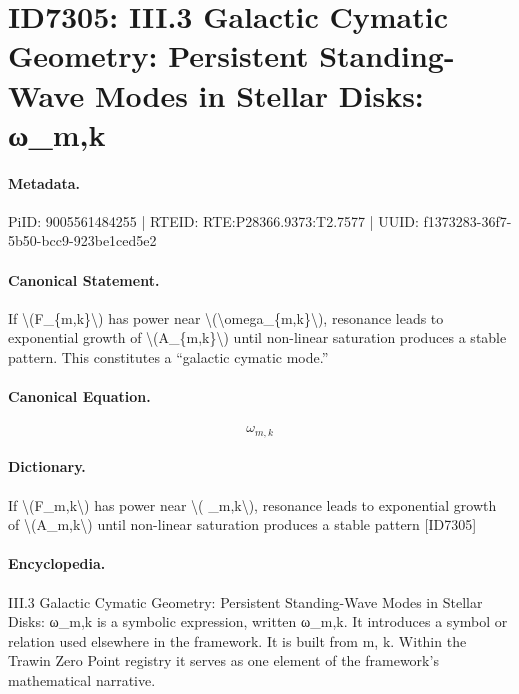 \section*{ID7305: III.3 Galactic Cymatic Geometry: Persistent Standing-Wave Modes in Stellar Disks: ω\_m,k}
\paragraph{Metadata.}
PiID: 9005561484255 | RTEID: RTE:P28366.9373:T2.7577 | UUID: f1373283-36f7-5b50-bcc9-923be1ced5e2

\paragraph{Canonical Statement.}
If \textbackslash{}(F\_\{m,k\}\textbackslash{}) has power near \textbackslash{}(\textbackslash{}omega\_\{m,k\}\textbackslash{}), resonance leads to exponential growth of \textbackslash{}(A\_\{m,k\}\textbackslash{}) until non-linear saturation produces a stable pattern. This constitutes a “galactic cymatic mode.”

\paragraph{Canonical Equation.}
\[
\omega_{m,k}
\]

\paragraph{Dictionary.}
If \textbackslash{}(F\_m,k\textbackslash{}) has power near \textbackslash{}( \_m,k\textbackslash{}), resonance leads to exponential growth of \textbackslash{}(A\_m,k\textbackslash{}) until non-linear saturation produces a stable pattern [ID7305]

\paragraph{Encyclopedia.}
III.3 Galactic Cymatic Geometry: Persistent Standing-Wave Modes in Stellar Disks: ω\_m,k is a symbolic expression, written ω\_m,k. It introduces a symbol or relation used elsewhere in the framework. It is built from m, k. Within the Trawin Zero Point registry it serves as one element of the framework's mathematical narrative.
